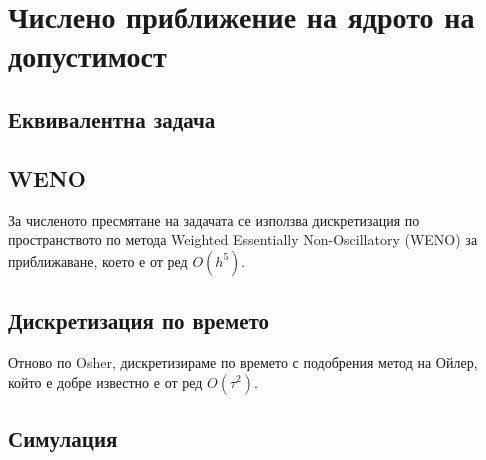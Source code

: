 \section{Числено приближение на ядрото на допустимост}
\subsection{Еквивалентна задача}
\cite{Osher2003}
\subsection{WENO}
За численото пресмятане на задачата се използва дискретизация по пространството по метода Weighted Essentially Non-Oscillatory (WENO) за приближаване, което е от ред $O(h^5)$.
\cite{Osher2003}

\subsection{Дискретизация по времето}
Отново по Osher, дискретизираме по времето с подобрения метод на Ойлер, който е добре известно е от ред $O(\tau^2)$.
\cite{Osher2003}
\subsection{Симулация}
